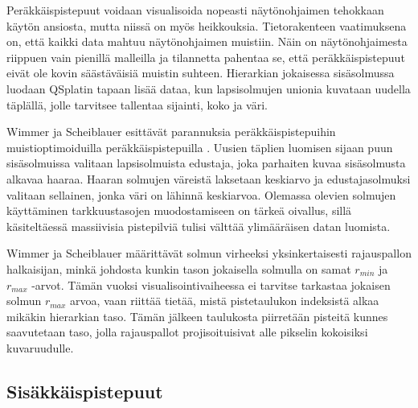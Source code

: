 Peräkkäispistepuut voidaan visualisoida nopeasti näytönohjaimen tehokkaan käytön ansiosta, mutta niissä on myös heikkouksia. Tietorakenteen vaatimuksena on, että kaikki data mahtuu näytönohjaimen muistiin. Näin on näytönohjaimesta riippuen vain pienillä malleilla ja tilannetta pahentaa se, että peräkkäispistepuut eivät ole kovin säästäväisiä muistin suhteen. Hierarkian jokaisessa sisäsolmussa luodaan QSplatin tapaan lisää dataa, kun lapsisolmujen unionia kuvataan uudella täplällä, jolle tarvitsee tallentaa sijainti, koko ja väri.

Wimmer ja Scheiblauer esittävät parannuksia peräkkäispistepuihin muistioptimoiduilla peräkkäispistepuilla . Uusien täplien luomisen sijaan puun sisäsolmuissa valitaan lapsisolmuista edustaja, joka parhaiten kuvaa sisäsolmusta alkavaa haaraa. Haaran solmujen väreistä laksetaan keskiarvo ja edustajasolmuksi valitaan sellainen, jonka väri on lähinnä keskiarvoa. Olemassa olevien solmujen käyttäminen tarkkuustasojen muodostamiseen on tärkeä oivallus, sillä käsiteltäessä massiivisia pistepilviä tulisi välttää ylimääräisen datan luomista. \cite{ip}

Wimmer ja Scheiblauer määrittävät solmun virheeksi yksinkertaisesti rajauspallon halkaisijan, minkä johdosta kunkin tason jokaisella solmulla on samat $r_{min}$ ja $r_{max}$ -arvot. Tämän vuoksi visualisointivaiheessa ei tarvitse tarkastaa jokaisen solmun $r_{max}$ arvoa, vaan riittää tietää, mistä pistetaulukon indeksistä alkaa mikäkin hierarkian taso. Tämän jälkeen taulukosta piirretään pisteitä kunnes saavutetaan taso, jolla rajauspallot projisoituisivat alle pikselin kokoisiksi kuvaruudulle. \cite{ip}



\subsection{Sisäkkäispistepuut}\label{sisäkkäis}

